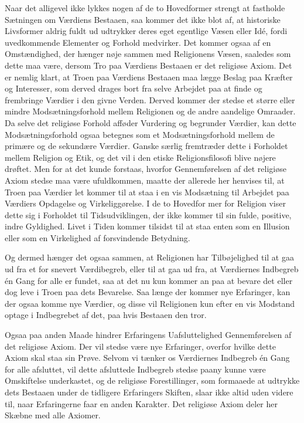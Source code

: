 \documentclass[12pt,a4paper,openany]{book}
\newcommand{\opage}[1]{\marginnote{\footnotesize\textit{[#1]}}}
\begin{document}
Naar det alligevel ikke lykkes nogen af de to Hovedformer strengt at
fastholde Sætningen om Værdiens Bestaaen, saa kommer det ikke blot af,
at historiske Livsformer aldrig fuldt ud udtrykker deres eget egentlige
Væsen eller Idé, fordi uvedkommende Elementer og Forhold medvirker. Det
kommer ogsaa af en Omstændighed, der hænger nøje sammen med Religionens
Væsen, saaledes som dette maa være, dersom Tro paa Værdiens Bestaaen er
det religiøse Axiom. Det er nemlig klart, at Troen paa Værdiens Bestaaen
maa lægge Beslag paa Kræfter og Interesser, som derved drages bort fra
selve Arbejdet paa at finde og frembringe Værdier i den givne Verden.
Derved kommer der stedse et større eller mindre Modsætningsforhold
mellem Religionen og de andre aandelige Omraader. Da selve det religiøse
Forhold afføder Vurdering og begrunder Værdier, kan dette
Modsætningsforhold ogsaa betegnes som et Modsætningsforhold mellem de
primære og de sekundære Værdier. Ganske særlig fremtræder dette i
Forholdet mellem Religion og Etik, og det vil i den etiske
Religionsfilosofi blive nøjere drøftet. Men for at det kunde forstaas,
hvorfor Gennemførelsen af det religiøse Axiom stedse maa være
ufuldkommen, maatte der allerede her henvises til, at Troen paa Værdier
let kommer til at staa i en vis Modsætning til Arbejdet paa Værdiers
Opdagelse og Virkeliggørelse. I de to Hovedfor%
\opage{164}mer for Religion viser dette sig i Forholdet til
Tidsudviklingen, der ikke kommer til sin fulde, positive, indre
Gyldighed. Livet i Tiden kommer tilsidst til at staa enten som en
Illusion eller som en Virkelighed af forsvindende Betydning.

Og dermed hænger det ogsaa sammen, at Religionen har Tilbøjelighed til
at gaa ud fra et for snevert Værdibegreb, eller til at gaa ud fra, at
Værdiernes Indbegreb én Gang for alle er fundet, saa at det nu kun
kommer an paa at bevare det eller dog leve i Troen paa dets Bevarelse.
Saa længe der kommer nye Erfaringer, kan der ogsaa komme nye Værdier, og
disse vil Religionen kun efter en vis Modstand optage i Indbegrebet af
det, paa hvis Bestaaen den tror.

Ogsaa paa anden Maade hindrer Erfaringens Uafsluttelighed Gennemførelsen
af det religiøse Axiom. Der vil stedse være nye Erfaringer, overfor
hvilke dette Axiom skal staa sin Prøve. Selvom vi tænker os Værdiernes
Indbegreb én Gang for alle afsluttet, vil dette afsluttede Indbegreb
stedse paany kunne være Omskiftelse underkastet, og de religiøse
Forestillinger, som formaaede at udtrykke dets Bestaaen under de
tidligere Erfaringers Skiften, slaar ikke altid uden videre til, naar
Erfaringerne faar en anden Karakter. Det religiøse Axiom deler her
Skæbne med alle Axiomer.
\end{document}
